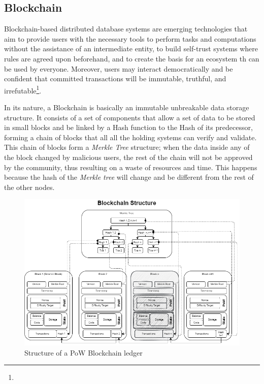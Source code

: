 \subsection{Blockchain}
\label{ch:approach:intro:blockchain}
Blockchain-based distributed database systems are emerging technologies that aim to provide users with the necessary tools to perform tasks and computations without the assistance of an intermediate entity, to build self-trust systems where rules are agreed upon beforehand, and to create the basis for an ecosystem th can be used by everyone. Moreover, users may interact democratically and be confident that committed transactions will be immutable, truthful, and irrefutable\footnote{}.

In its nature, a Blockchain is basically an immutable unbreakable data storage structure. It consists of a set of components that allow a set of data to be stored in small blocks and be linked by a Hash function to the Hash of its predecessor, forming a chain of blocks that all all the holding systems can verify and validate. This chain of blocks form a \emph{Merkle Tree} structure; when the data inside any of the block changed by malicious users,  the rest of the chain will not be approved by the community, thus resulting on a waste of resources and time. This happens because the hash of the \emph{Merkle tree} will change and be different from the rest of the other nodes.

\begin{figure}[!h]
    \centering
    \includegraphics[width=180mm]{img/BlockchainStructure.png}
    \caption{Structure of a \ac{PoW} Blockchain ledger}
    \label{fig:BlockchainStructure}
\end{figure}

